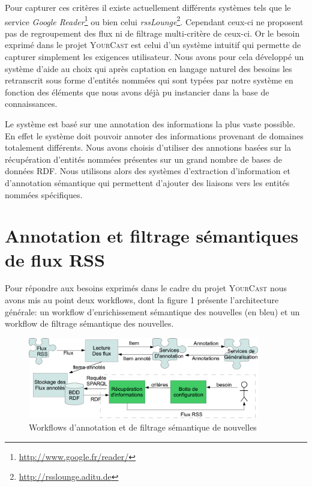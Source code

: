 \documentclass[]{easychair}
\newcommand{\Y}[0]{\textsc{YourCast}\xspace}
\begin{document}
Pour capturer ces critères il existe actuellement différents systèmes tels que le service \textsl{Google Reader}\footnote{\url{http://www.google.fr/reader/}} ou bien celui \textsl{rssLounge}\footnote{\url{http://rsslounge.aditu.de}}. Cependant ceux-ci ne proposent pas de regroupement des flux ni de filtrage multi-critère de ceux-ci.
Or le besoin exprimé dans le projet \Y est celui d'un système intuitif qui permette de capturer simplement les exigences utilisateur. Nous avons pour cela développé un système d'aide au choix qui après captation en langage naturel des besoins les retranscrit sous forme d'entités nommées qui sont typées par notre système en fonction des éléments que nous avons déjà pu instancier dans la base de connaissances.

Le système est basé sur une annotation des informations la plus vaste possible. En effet le système doit pouvoir annoter des informations provenant de domaines totalement différents.
Nous avons choisis d'utiliser des annotions basées sur la récupération d'entités nommées présentes sur un grand nombre de bases de données RDF.
Nous utilisons alors des systèmes d'extraction d'information et d'annotation sémantique qui permettent d'ajouter des liaisons vers les entités nommées spécifiques.



\section{Annotation et filtrage sémantiques de flux RSS}
\label{sect:miseEnOuvre}
Pour répondre aux besoins exprimés dans le cadre du projet \Y nous avons mis au point deux workflows, dont la figure 1 présente  l'architecture générale: un workflow d'enrichissement sémantique des nouvelles (en bleu) et un workflow de filtrage sémantique des nouvelles.

\begin{figure}[htb!]
	\begin{centering}
	\includegraphics[width=0.9\textwidth]{diagramme-Archi.png}
	\caption{Workflows d'annotation et de filtrage sémantique de nouvelles}
	\label{fig:mmFM}
	\end{centering}
\end{figure}
\end{document}
